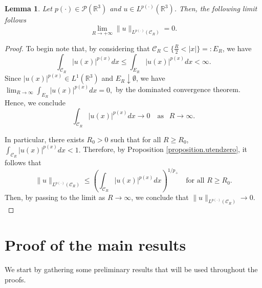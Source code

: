 \documentclass[a4paper,12pt]{amsart}
\theoremstyle{definition}
\theoremstyle{plain}
\newtheorem{lemma}{Lemma}[section]
\def\R{\mathbb{R}}
\def\R{\mathbb R}
\begin{document}
 
\begin{lemma} \label{Lemma.utendzero}
Let $p(\cdot)\in \mathcal{P}(\R^3 )$  and $u\in L^{p(\cdot)}(\R^3 )$. 
Then, the following limit follows
\begin{equation}
\lim_{R\to +\infty} \| u\|_{L^{p(\cdot)}( \mathcal{C}_R  )} =0
.
\end{equation}
\end{lemma}
%
\begin{proof}
To begin note that, by considering that $ \mathcal{C}_R  \subset \{ \frac R 2 < |x| \}=:E_R$, we have 
\begin{equation}
\int_{ \mathcal{C}_R } |u(x)|^{p(x)}dx
\leq 
\int_{E_R} |u(x)|^{p(x)}dx<\infty.
\end{equation}
Since $|u(x)|^{p(x)} \in L^1(\mathbb{R}^3)$ and $E_R \downarrow \emptyset$, we have
$
\lim_{R \to \infty} \int_{E_R} |u(x)|^{p(x)}dx = 0,
$
by the dominated convergence theorem.
Hence, we conclude 
$$\int_{ \mathcal{C}_R } |u(x)|^{p(x)}dx \to  0\quad   
 \text{as } \ \  R \to \infty .$$
 
 

\noindent 
In particular, there exists $R_0>0$ such that for all $R \ge R_0$,
$
\int_{ \mathcal{C}_R } |u(x)|^{p(x)}dx <1.
$
Therefore, by Proposition \ref{proposition.utendzero}, it follows that
\[
\|u\|_{L^{p(\cdot)}( \mathcal{C}_R )}
\le \left(\int_{ \mathcal{C}_R } |u(x)|^{p(x)}dx \right)^{1/p_+}
\quad \text{for all } R \ge R_0.
\]
Then,  by passing to the limit as $R\to\infty$, we conclude that
$
\|u\|_{L^{p(\cdot)}( \mathcal{C}_R )} \to 0.
$
 \end{proof}

 
\section{Proof of the main results}\label{sec:3}
 
We start by gathering some preliminary results that will be used throughout the proofs.
 
\end{document}
